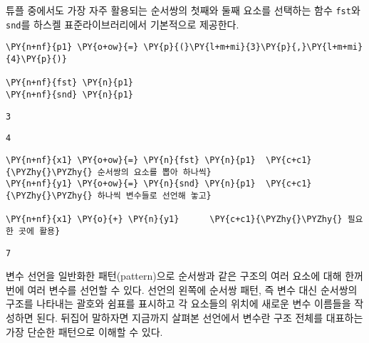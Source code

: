     
    튜플 중에서도 가장 자주 활용되는 순서쌍의 첫째와 둘째 요소를 선택하는
함수 \texttt{fst}와 \texttt{snd}를 하스켈 표준라이브러리에서 기본적으로
제공한다.

    \begin{tcolorbox}[breakable, size=fbox, boxrule=1pt, pad at break*=1mm,colback=cellbackground, colframe=cellborder, top=.75ex]
\begin{Verbatim}[commandchars=\\\{\}]
\PY{n+nf}{p1} \PY{o+ow}{=} \PY{p}{(}\PY{l+m+mi}{3}\PY{p}{,}\PY{l+m+mi}{4}\PY{p}{)} 

\PY{n+nf}{fst} \PY{n}{p1}
\PY{n+nf}{snd} \PY{n}{p1}
\end{Verbatim}
\end{tcolorbox}

    
    \begin{Verbatim}[commandchars=\\\{\}]
3
    \end{Verbatim}

    
    
    \begin{Verbatim}[commandchars=\\\{\}]
4
    \end{Verbatim}

    
    \begin{tcolorbox}[breakable, size=fbox, boxrule=1pt, pad at break*=1mm,colback=cellbackground, colframe=cellborder, top=.75ex]
\begin{Verbatim}[commandchars=\\\{\}]
\PY{n+nf}{x1} \PY{o+ow}{=} \PY{n}{fst} \PY{n}{p1}  \PY{c+c1}{\PYZhy{}\PYZhy{} 순서쌍의 요소를 뽑아 하나씩}
\PY{n+nf}{y1} \PY{o+ow}{=} \PY{n}{snd} \PY{n}{p1}  \PY{c+c1}{\PYZhy{}\PYZhy{} 하나씩 변수들로 선언해 놓고}

\PY{n+nf}{x1} \PY{o}{+} \PY{n}{y1}      \PY{c+c1}{\PYZhy{}\PYZhy{} 필요한 곳에 활용}
\end{Verbatim}
\end{tcolorbox}

    
    \begin{Verbatim}[commandchars=\\\{\}]
7
    \end{Verbatim}

    
    변수 선언을 일반화한 패턴(pattern)으로 순서쌍과 같은 구조의 여러 요소에
대해 한꺼번에 여러 변수를 선언할 수 있다. 선언의 왼쪽에 순서쌍 패턴, 즉
변수 대신 순서쌍의 구조를 나타내는 괄호와 쉼표를 표시하고 각 요소들의
위치에 새로운 변수 이름들을 작성하면 된다. 뒤집어 말하자면 지금까지
살펴본 선언에서 변수란 구조 전체를 대표하는 가장 단순한 패턴으로 이해할
수 있다.


